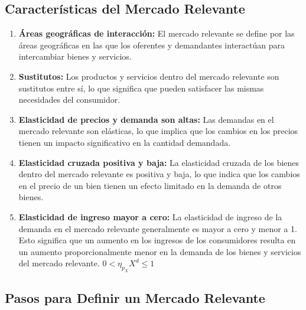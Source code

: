 \documentclass[
  doc,
  floatsintext,
  longtable,
  a4paper,
  nolmodern,
  notxfonts,
  notimes,
  12pt,
  colorlinks=true,linkcolor=blue,citecolor=blue,urlcolor=blue]{apa7}
\begin{document}
\subsection{Características del Mercado
Relevante}\label{caracteruxedsticas-del-mercado-relevante}

\begin{enumerate}
\def\labelenumi{\arabic{enumi}.}
\item
  \textbf{Áreas geográficas de interacción:} El mercado relevante se
  define por las áreas geográficas en las que los oferentes y
  demandantes interactúan para intercambiar bienes y servicios.
\item
  \textbf{Sustitutos:} Los productos y servicios dentro del mercado
  relevante son sustitutos entre sí, lo que significa que pueden
  satisfacer las mismas necesidades del consumidor.
\item
  \textbf{Elasticidad de precios y demanda son altas:} Las demandas en
  el mercado relevante son elásticas, lo que implica que los cambios en
  los precios tienen un impacto significativo en la cantidad demandada.
\item
  \textbf{Elasticidad cruzada positiva y baja:} La elasticidad cruzada
  de los bienes dentro del mercado relevante es positiva y baja, lo que
  indica que los cambios en el precio de un bien tienen un efecto
  limitado en la demanda de otros bienes.
\item
  \textbf{Elasticidad de ingreso mayor a cero:} La elasticidad de
  ingreso de la demanda en el mercado relevante generalmente es mayor a
  cero y menor a 1. Esto significa que un aumento en los ingresos de los
  consumidores resulta en un aumento proporcionalmente menor en la
  demanda de los bienes y servicios del mercado relevante.
  \(0 < \eta_{p_{X}} X^d \leq 1\)
\end{enumerate}

\subsection{Pasos para Definir un Mercado
Relevante}\label{pasos-para-definir-un-mercado-relevante}
\end{document}
